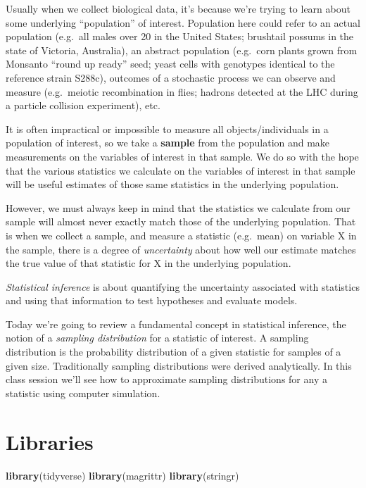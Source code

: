 \documentclass[]{book}
\newenvironment{Shaded}{\begin{snugshade}}{\end{snugshade}}
\newcommand{\KeywordTok}[1]{\textcolor[rgb]{0.13,0.29,0.53}{\textbf{#1}}}
\newcommand{\NormalTok}[1]{#1}
\theoremstyle{definition}
\theoremstyle{definition}
\theoremstyle{definition}
\theoremstyle{remark}
\begin{document}
Usually when we collect biological data, it's because we're trying to
learn about some underlying ``population'' of interest. Population here
could refer to an actual population (e.g.~all males over 20 in the
United States; brushtail possums in the state of Victoria, Australia),
an abstract population (e.g.~corn plants grown from Monsanto ``round up
ready'' seed; yeast cells with genotypes identical to the reference
strain S288c), outcomes of a stochastic process we can observe and
measure (e.g.~meiotic recombination in flies; hadrons detected at the
LHC during a particle collision experiment), etc.

It is often impractical or impossible to measure all objects/individuals
in a population of interest, so we take a \textbf{sample} from the
population and make measurements on the variables of interest in that
sample. We do so with the hope that the various statistics we calculate
on the variables of interest in that sample will be useful estimates of
those same statistics in the underlying population.

However, we must always keep in mind that the statistics we calculate
from our sample will almost never exactly match those of the underlying
population. That is when we collect a sample, and measure a statistic
(e.g.~mean) on variable X in the sample, there is a degree of
\emph{uncertainty} about how well our estimate matches the true value of
that statistic for X in the underlying population.

\emph{Statistical inference} is about quantifying the uncertainty
associated with statistics and using that information to test hypotheses
and evaluate models.

Today we're going to review a fundamental concept in statistical
inference, the notion of a \emph{sampling distribution} for a statistic
of interest. A sampling distribution is the probability distribution of
a given statistic for samples of a given size. Traditionally sampling
distributions were derived analytically. In this class session we'll see
how to approximate sampling distributions for any a statistic using
computer simulation.

\hypertarget{libraries-5}{%
\section{Libraries}\label{libraries-5}}

\begin{Shaded}
\begin{Highlighting}[]
\KeywordTok{library}\NormalTok{(tidyverse)}
\KeywordTok{library}\NormalTok{(magrittr)}
\KeywordTok{library}\NormalTok{(stringr)}
\end{Highlighting}
\end{Shaded}
\end{document}
